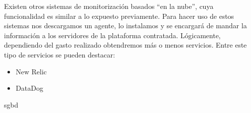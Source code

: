 Existen otros sistemas de monitorización basados “en la nube”, cuya funcionalidad es similar a lo expuesto previamente. Para hacer uso de estos sistemas nos descargamos un agente, lo instalamos y se encargará de mandar la información a los servidores de la plataforma contratada. Lógicamente, dependiendo del gasto realizado obtendremos más o menos servicios. Entre este tipo de servicios se pueden destacar:
\begin{itemize}
    \item New Relic
    \item DataDog
\end{itemize}

\def\test{sgbd}
\ifx\test\@minititle
\else
\fi

\clearpage